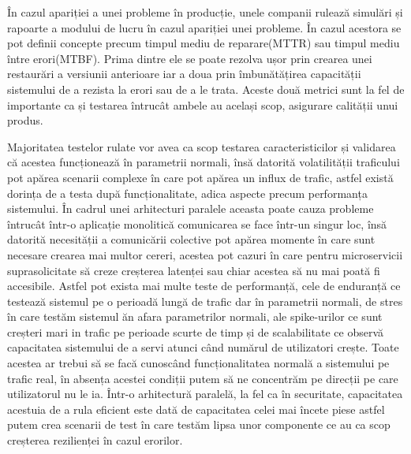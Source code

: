 În cazul apariției a unei probleme în producție, unele companii rulează simulări și rapoarte
a modului de lucru în cazul apariției unei probleme. În cazul acestora se pot definii concepte 
precum timpul mediu de reparare(MTTR) sau timpul mediu între erori(MTBF). Prima dintre ele
se poate rezolva ușor prin crearea unei restaurări a versiunii anterioare iar a doua prin 
îmbunătățirea capacității sistemului de a rezista la erori sau de a le trata. Aceste două metrici
sunt la fel de importante ca și testarea întrucât ambele au același scop, asigurare calității 
unui produs.

Majoritatea testelor rulate vor avea ca scop testarea caracteristicilor și validarea
că acestea funcționează în parametrii normali, însă datorită volatilității traficului
pot apărea scenarii complexe în care pot apărea un influx de trafic, astfel există 
dorința de a testa după funcționalitate, adica aspecte precum performanța sistemului.
În cadrul unei arhitecturi paralele aceasta poate cauza probleme întrucât într-o aplicație
monolitică comunicarea se face într-un singur loc, însă datorită necesității a comunicării 
colective pot apărea momente în care sunt necesare crearea mai multor cereri, acestea pot
cazuri în care pentru microservicii suprasolicitate să creze creșterea latenței sau
chiar acestea să nu mai poată fi accesibile. Astfel pot exista mai multe teste de performanță,
cele de enduranță ce testează sistemul pe o perioadă lungă de trafic dar în parametrii normali,
de stres în care testăm sistemul ăn afara parametrilor normali, ale spike-urilor ce sunt creșteri
mari in trafic pe perioade scurte de timp și de scalabilitate ce observă capacitatea 
sistemului de a servi atunci când numărul de utilizatori crește. Toate acestea ar trebui să 
se facă cunoscând funcționalitatea normală a sistemului pe trafic real, în absența acestei condiții
putem să ne concentrăm pe direcții pe care utilizatorul nu le ia. Într-o arhitectură paralelă,
la fel ca în securitate, capacitatea acestuia de a rula eficient este dată de capacitatea celei
mai încete piese astfel putem crea scenarii de test în care testăm lipsa unor componente ce
au ca scop creșterea rezilienței în cazul erorilor.

